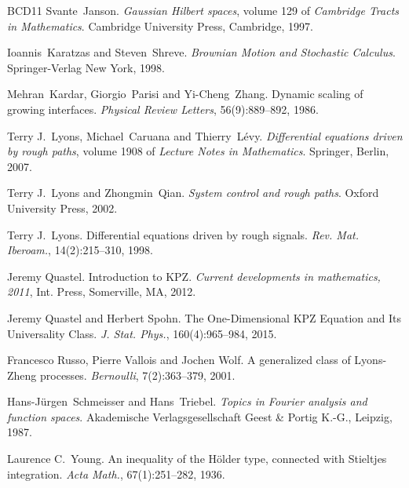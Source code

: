 \documentclass[a4paper,11pt]{article}
\newcommand{\tmtextit}[1]{{\itshape{#1}}}
\begin{document}
\begin{thebibliography}{BCD11}
  Svante~Janson.{\newblock} \tmtextit{Gaussian
  Hilbert spaces},  volume  129  of \tmtextit{Cambridge Tracts in
  Mathematics}.{\newblock} Cambridge University Press, Cambridge,
  1997.{\newblock}
  
   Ioannis~Karatzas and Steven~Shreve. \newblock 
  \tmtextit{Brownian Motion and Stochastic Calculus}. \newblock Springer-Verlag New York, 1998.
  
  Mehran~Kardar, Giorgio~Parisi  and 
  Yi-Cheng~Zhang.{\newblock} Dynamic scaling of growing interfaces.{\newblock}
  \tmtextit{Physical Review Letters}, 56(9):889--892, 1986.{\newblock}
  
  Terry J.~Lyons, Michael~Caruana  and 
  Thierry~L{\'e}vy.{\newblock} \tmtextit{Differential equations driven
  by rough paths},  volume  1908  of \tmtextit{Lecture Notes in
  Mathematics}.{\newblock} Springer, Berlin, 2007.{\newblock}
  
  Terry J.~Lyons  and  Zhongmin~Qian.{\newblock}
  \tmtextit{System control and rough paths}.{\newblock} Oxford University
  Press, 2002.{\newblock}
  
  Terry J.~Lyons.{\newblock} Differential equations
  driven by rough signals.{\newblock} \tmtextit{Rev. Mat. Iberoam.},
  14(2):215--310, 1998.{\newblock}
  
Jeremy Quastel. {\newblock} Introduction to {KPZ}. {\newblock} \tmtextit{Current developments in
  mathematics, 2011}, Int. Press, Somerville, MA, 2012. {\newblock}

Jeremy Quastel and Herbert Spohn.{\newblock} The One-Dimensional {KPZ} Equation and Its Universality Class. {\newblock} \tmtextit{J. Stat. Phys.}, 160(4):965--984, 2015. {\newblock}
  
  Francesco Russo, Pierre Vallois and Jochen Wolf.{\newblock} A generalized class of Lyons-Zheng processes.{\newblock} \tmtextit{Bernoulli},
  7(2):363--379, 2001.{\newblock}  
  
  Hans-J{\"u}rgen~Schmeisser  and  Hans~Triebel.{\newblock}
  \tmtextit{Topics in Fourier analysis and function spaces}.{\newblock} Akademische
  Verlagsgesellschaft Geest \& Portig K.-G., Leipzig, 1987.{\newblock}
  
  Laurence C.~Young.{\newblock} An inequality of the
  H{\"o}lder type, connected with Stieltjes integration.{\newblock}
  \tmtextit{Acta Math.}, 67(1):251--282, 1936.{\newblock}
\end{thebibliography}
\end{document}
